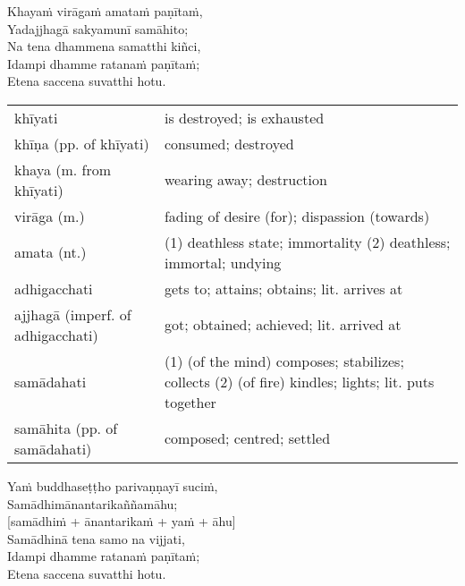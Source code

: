 \documentclass[11pt,oneside]{memoir}
\begin{document}
\begin{spacedquote}
Khayaṁ virāgaṁ amataṁ paṇītaṁ, \\[0pt]
Yadajjhagā sakyamunī samāhito; \\[0pt]
Na tena dhammena samatthi kiñci, \\[0pt]
Idampi dhamme ratanaṁ paṇītaṁ; \\[0pt]
Etena saccena suvatthi hotu.
\end{spacedquote}

\enlargethispage{\baselineskip}

\begin{longtable}{L{\colOne} L{\colTwo}}
khīyati & is destroyed; is exhausted\\[0pt]
khīṇa (pp. of khīyati) & consumed; destroyed\\[0pt]
khaya (m. from khīyati) & wearing away; destruction\\[0pt]
virāga (m.) & fading of desire (for); dispassion (towards)\\[0pt]
amata (nt.) & (1) deathless state; immortality (2) deathless; immortal; undying\\[0pt]
adhigacchati & gets to; attains; obtains; lit. arrives at\\[0pt]
ajjhagā (imperf. of adhigacchati) & got; obtained; achieved; lit. arrived at\\[0pt]
samādahati & (1) (of the mind) composes; stabilizes; collects (2) (of fire) kindles; lights; lit. puts together\\[0pt]
samāhita (pp. of samādahati) & composed; centred; settled\\[0pt]
\end{longtable}

\clearpage

\begin{spacedquote}
Yaṁ buddhaseṭṭho parivaṇṇayī suciṁ, \\[0pt]
Samādhimānantarikaññamāhu; \\[0pt]
[samādhiṁ + ānantarikaṁ + yaṁ + āhu] \\[0pt]
Samādhinā tena samo na vijjati, \\[0pt]
Idampi dhamme ratanaṁ paṇītaṁ; \\[0pt]
Etena saccena suvatthi hotu.
\end{spacedquote}
\end{document}
